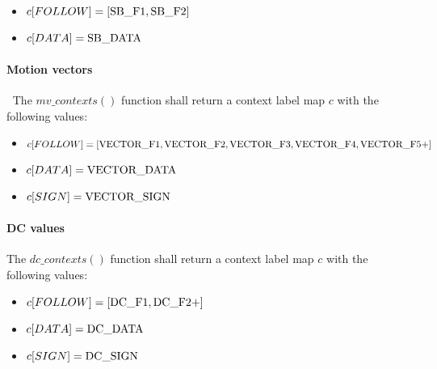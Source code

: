 \begin{itemize}
\item $c[FOLLOW] = [ \text{SB\_F1}, \text{SB\_F2} ]$
\item $c[DATA] = \text{SB\_DATA}$
\end{itemize}

\paragraph{Motion vectors}
\label{mvcontexts}
$\ $\newline
The $mv\_contexts()$ function shall return a context label map $c$ with the 
following values:

\begin{itemize}
\item $c[FOLLOW] = [ \text{VECTOR\_F1}, \text{VECTOR\_F2}, \text{VECTOR\_F3}, \text{VECTOR\_F4}, \text{VECTOR\_F5+} ]$
\item $c[DATA] = \text{VECTOR\_DATA}$
\item $c[SIGN] = \text{VECTOR\_SIGN}$
\end{itemize}

\paragraph{DC values}
\label{dcvaluecontexts}

The $dc\_contexts()$ function shall return a context label map $c$ with the 
following values:

\begin{itemize}
\item $c[FOLLOW] = [ \text{DC\_F1}, \text{DC\_F2+} ]$
\item $c[DATA] = \text{DC\_DATA}$
\item $c[SIGN] = \text{DC\_SIGN}$
\end{itemize}
